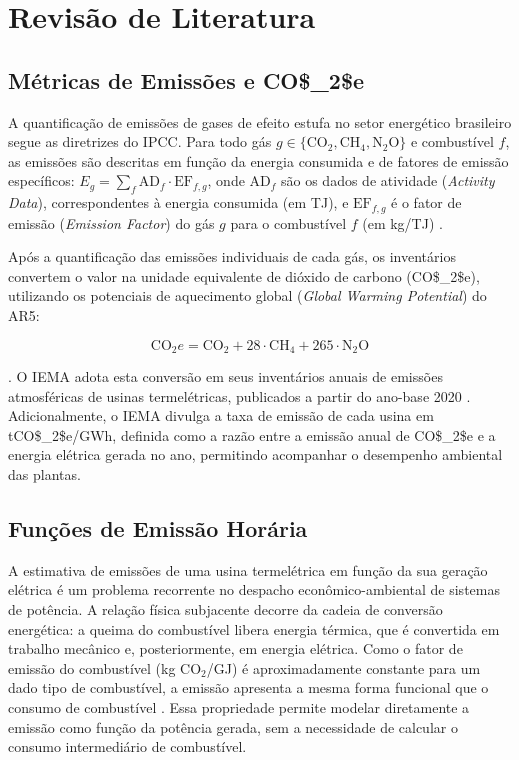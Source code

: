 \chapter{Revisão de Literatura}\label{chp:rev}

\section{Métricas de Emissões e \ac{CO$_2$e}}

A quantificação de emissões de gases de efeito estufa no setor energético brasileiro segue as diretrizes do \ac{IPCC}. Para todo gás \(g \in \{\text{CO}_2, \text{CH}_4, \text{N}_2\text{O}\}\) e combustível \(f\), as emissões são descritas em função da energia consumida e de fatores de emissão específicos: \(E_g = \sum_f \text{AD}_f \cdot \text{EF}_{f,g}\), onde \(\text{AD}_f\) são os dados de atividade (\textit{Activity Data}), correspondentes à energia consumida (em TJ), e \(\text{EF}_{f,g}\) é o fator de emissão (\textit{Emission Factor}) do gás \(g\) para o combustível \(f\) (em kg/TJ) \cite{ipcc2006}.

Após a quantificação das emissões individuais de cada gás, os inventários convertem o valor na unidade equivalente de dióxido de carbono (\ac{CO$_2$e}), utilizando os potenciais de aquecimento global (\textit{Global Warming Potential}) do \ac{AR5}:

\begin{equation}
\text{CO}_2e = \text{CO}_2 + 28 \cdot \text{CH}_4 + 265 \cdot \text{N}_2\text{O}
\label{eq:co2e}
\end{equation}

\cite{ipcc2014}. O \ac{IEMA} adota esta conversão em seus inventários anuais de emissões atmosféricas de usinas termelétricas, publicados a partir do ano-base 2020 \cite{iema2022, iema2023, iema2024}. Adicionalmente, o \ac{IEMA} divulga a taxa de emissão de cada usina em \ac{tCO$_2$e}/GWh, definida como a razão entre a emissão anual de \ac{CO$_2$e} e a energia elétrica gerada no ano, permitindo acompanhar o desempenho ambiental das plantas.

\section{Funções de Emissão Horária}

A estimativa de emissões de uma usina termelétrica em função da sua geração elétrica é um problema recorrente no despacho econômico-ambiental de sistemas de potência. A relação física subjacente decorre da cadeia de conversão energética: a queima do combustível libera energia térmica, que é convertida em trabalho mecânico e, posteriormente, em energia elétrica. Como o fator de emissão do combustível (kg CO\(_2\)/GJ) é aproximadamente constante para um dado tipo de combustível, a emissão apresenta a mesma forma funcional que o consumo de combustível \cite{ipcc2006}. Essa propriedade permite modelar diretamente a emissão como função da potência gerada, sem a necessidade de calcular o consumo intermediário de combustível.

